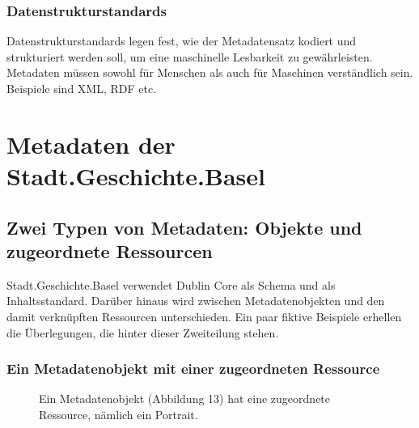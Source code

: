 \documentclass[
  letterpaper,
  DIV=11,
  numbers=noendperiod,
  landscape,
  a4paper,
  geometry:margin=1in]{scrartcl}
\begin{document}
\subsubsection{Datenstrukturstandards}\label{datenstrukturstandards}

Datenstrukturstandards legen fest, wie der Metadatensatz kodiert und
strukturiert werden soll, um eine maschinelle Lesbarkeit zu
gewährleisten. Metadaten müssen sowohl für Menschen als auch für
Maschinen verständlich sein. Beispiele sind XML, RDF etc.

\section{Metadaten der Stadt.Geschichte.Basel}\label{sec-metadaten}

\subsection{Zwei Typen von Metadaten: Objekte und zugeordnete
Ressourcen}\label{zwei-typen-von-metadaten-objekte-und-zugeordnete-ressourcen}

Stadt.Geschichte.Basel verwendet Dublin Core als Schema und als
Inhaltsstandard. Darüber hinaus wird zwischen Metadatenobjekten und den
damit verknüpften Ressourcen unterschieden. Ein paar fiktive Beispiele
erhellen die Überlegungen, die hinter dieser Zweiteilung stehen.

\subsubsection{Ein Metadatenobjekt mit einer zugeordneten
Ressource}\label{ein-metadatenobjekt-mit-einer-zugeordneten-ressource}

\begin{figure}


\caption{\label{fig-metadata-1}Ein Metadatenobjekt (Abbildung 13) hat
eine zugeordnete Ressource, nämlich ein Portrait.}

\end{figure}%
\end{document}
